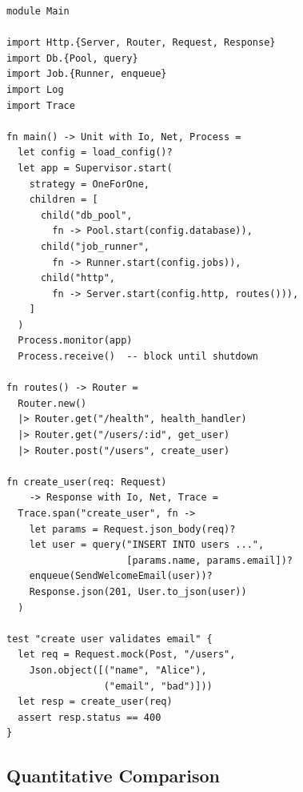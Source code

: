 \documentclass[11pt,twocolumn]{article}
\begin{document}
\begin{lstlisting}
module Main

import Http.{Server, Router, Request, Response}
import Db.{Pool, query}
import Job.{Runner, enqueue}
import Log
import Trace

fn main() -> Unit with Io, Net, Process =
  let config = load_config()?
  let app = Supervisor.start(
    strategy = OneForOne,
    children = [
      child("db_pool",
        fn -> Pool.start(config.database)),
      child("job_runner",
        fn -> Runner.start(config.jobs)),
      child("http",
        fn -> Server.start(config.http, routes())),
    ]
  )
  Process.monitor(app)
  Process.receive()  -- block until shutdown

fn routes() -> Router =
  Router.new()
  |> Router.get("/health", health_handler)
  |> Router.get("/users/:id", get_user)
  |> Router.post("/users", create_user)

fn create_user(req: Request)
    -> Response with Io, Net, Trace =
  Trace.span("create_user", fn ->
    let params = Request.json_body(req)?
    let user = query("INSERT INTO users ...",
                     [params.name, params.email])?
    enqueue(SendWelcomeEmail(user))?
    Response.json(201, User.to_json(user))
  )

test "create user validates email" {
  let req = Request.mock(Post, "/users",
    Json.object([("name", "Alice"),
                 ("email", "bad")]))
  let resp = create_user(req)
  assert resp.status == 400
}
\end{lstlisting}

\subsection{Quantitative Comparison}
\end{document}

